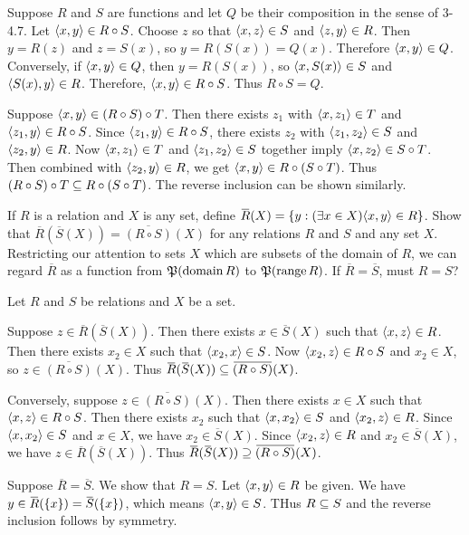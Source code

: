 \begin{solution}
Suppose $R$ and $S$ are functions and let $Q$ be their composition in the sense of 3-4.7.
Let $\left\langle x,y\right\rangle\in R\circ S$. Choose $z$ so that $\left\langle x,z\right\rangle\in S$ and $\left\langle z,y\right\rangle\in R$.
Then $y=R(z)$ and $z=S(x)$, so $y=R(S(x))=Q(x)$. Therefore $\left\langle x,y\right\rangle\in Q$.
Conversely, if $\left\langle x,y\right\rangle\in Q$, then $y=R(S(x))$, so $\left\langle x,S(x)\right\rangle\in S$ and $\left\langle S(x),y\right\rangle\in R$.
Therefore, $\left\langle x,y\right\rangle\in R\circ S$. Thus $R\circ S=Q$.

Suppose $\left\langle x, y\right\rangle\in (R\circ S)\circ T$. Then there exists $z_1$ with $\left\langle x,z_1\right\rangle\in T$
and $\left\langle z_1, y\right\rangle\in R\circ S$.
Since $\left\langle z_1, y\right\rangle\in R\circ S$, there exists $z_2$ with $\left\langle z_1,z_2\right\rangle\in S$ and $\left\langle z_2, y\right\rangle\in R$.
Now $\left\langle x,z_1\right\rangle\in T$ and $\left\langle z_1,z_2\right\rangle\in S$ together imply $\left\langle x,z_2\right\rangle\in S\circ T$.
Then combined with $\left\langle z_2, y\right\rangle\in R$, we get $\left\langle x, y\right\rangle\in R\circ(S\circ T)$.
Thus $(R\circ S)\circ T\subseteq R\circ(S\circ T)$.
The reverse inclusion can be shown similarly.
\end{solution}

\begin{exercise}
If $R$ is a relation and $X$ is any set, define $\overbar{R}(X) = \setb{y}{(\exists x \in X) \aprn{x, y} \in R}$.
Show that $\overbar{R}(\overbar{S}(X))=\overbar{(R\circ S)}(X)$ for any relations $R$ and $S$ and any set $X$.
Restricting our attention to sets $X$ which are subsets of the domain of $R$, we can regard $\overbar R$ as a function
from $\operatorname{\mathfrak{P}}(\operatorname{domain} R)$ to $\operatorname{\mathfrak{P}}(\operatorname{range} R)$. If $\overbar R = \overbar S$, must $R = S$?
\end{exercise}

\begin{solution}
Let $R$ and $S$ be relations and $X$ be a set.

Suppose $z\in \overbar{R}(\overbar{S}(X))$. Then there exists $x\in \overbar{S}(X)$ such that
$\left\langle x, z\right\rangle\in R$. Then there exists $x_2\in X$ such that $\left\langle x_2,x\right\rangle\in S$.
Now $\left\langle x_2, z\right\rangle\in R\circ S$ and $x_2\in X$, so $z\in\overbar{(R\circ S)}(X)$.
Thus $\overbar{R}(\overbar{S}(X))\sse \overbar{(R\circ S)}(X)$.

Conversely, suppose $z\in \overbar{(R\circ S)}(X)$. Then there exists $x\in X$ such that
$\left\langle x, z\right\rangle\in R\circ S$. Then there exists $x_2$ such that $\left\langle x,x_2\right\rangle\in S$ and
$\left\langle x_2,z\right\rangle\in R$.
Since $\left\langle x,x_2\right\rangle\in S$ and $x\in X$, we have $x_2\in\overbar{S}(X)$.
Since $\left\langle x_2,z\right\rangle\in R$ and $x_2\in\overbar{S}(X)$, we have $z\in\overbar{R}(\overbar{S}(X))$.
Thus $\overbar{R}(\overbar{S}(X))\Sse \overbar{(R\circ S)}(X)$.

Suppose $\overbar R=\overbar S$. We show that $R=S$.
Let $\left\langle x,y\right\rangle\in R$ be given. We have $y\in \overbar R(\set{x})=\overbar S(\set{x})$, which means
$\left\langle x,y\right\rangle\in S$. THus $R\subseteq S$ and the reverse inclusion follows by symmetry.
\end{solution}

